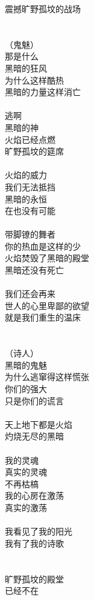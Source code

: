 震撼旷野孤坟的战场\\
\\
\\
（鬼魅）\\
那是什么\\
黑暗的狂风\\
为什么这样酷热\\
黑暗的力量这样消亡\\
\\
逃啊\\
黑暗的神\\
火焰已经点燃\\
旷野孤坟的筵席\\
\\
火焰的威力\\
我们无法抵挡\\
黑暗的永恒\\
在也没有可能\\
\\
带脚镣的舞者\\
你的热血是这样的少\\
火焰焚毁了黑暗的殿堂\\
黑暗还没有死亡\\
\\
我们还会再来\\
世人的心里卑鄙的欲望\\
就是我们重生的温床\\
\\
\\
（诗人）\\
黑暗的鬼魅\\
为什么逃窜得这样慌张\\
你们的强大\\
只是你们的谎言\\
\\
天上地下都是火焰\\
灼烧无尽的黑暗\\
\\
我的灵魂\\
真实的灵魂\\
不再枯槁\\
我的心房在激荡\\
真实的激荡\\
\\
我看见了我的阳光\\
我有了我的诗歌\\
\\
\\
旷野孤坟的殿堂\\
已经不在\\
